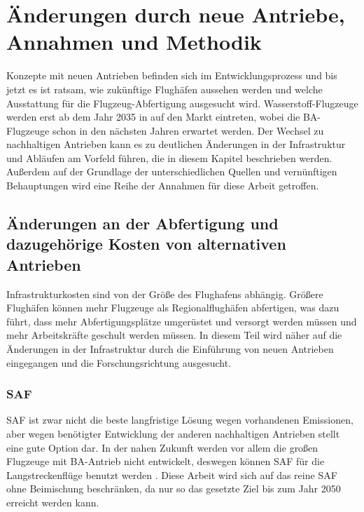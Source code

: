 \chapter{Änderungen durch neue Antriebe, Annahmen und Methodik}
\label{ch:Änderungen durch neue Antriebe, Annahmen und Methodik}

Konzepte mit neuen Antrieben befinden sich im Entwicklungsprozess und bis jetzt es ist ratsam, wie zukünftige Flughäfen aussehen werden
und welche Ausstattung für die Flugzeug-Abfertigung ausgesucht wird. Wasserstoff-Flugzeuge werden erst ab dem Jahr 2035 in 
auf den Markt eintreten, wobei die BA-Flugzeuge schon in den nächsten Jahren erwartet werden.
Der Wechsel zu nachhaltigen Antrieben kann es zu deutlichen Änderungen in der Infrastruktur und Abläufen am Vorfeld führen, die
in diesem Kapitel beschrieben werden.
Außerdem auf der Grundlage der unterschiedlichen Quellen und vernünftigen Behauptungen wird eine Reihe der Annahmen für diese Arbeit getroffen.
%

\section{Änderungen an der Abfertigung und dazugehörige Kosten von alternativen Antrieben}
\label{s:Änderungen an der Abfertigung und dazugehörige Kosten von alternativen Antrieben}

Infrastrukturkosten sind von der Größe des Flughafens abhängig. Größere Flughäfen können mehr Flugzeuge als Regionalflughäfen 
abfertigen, was dazu führt, dass mehr Abfertigungsplätze umgerüstet und versorgt werden müssen und mehr Arbeitskräfte geschult werden müssen. 
In diesem Teil wird näher auf die Änderungen in der Infrastruktur durch die Einführung von neuen Antrieben eingegangen und 
die Forschungsrichtung ausgesucht.

\subsection{SAF}
SAF ist zwar nicht die beste langfristige Lösung wegen vorhandenen Emissionen, aber wegen benötigter Entwicklung der anderen nachhaltigen
Antrieben stellt eine gute Option dar. In der nahen Zukunft werden vor allem die großen Flugzeuge mit BA-Antrieb nicht entwickelt, 
deswegen können SAF für die Langstreckenflüge benutzt werden \cite{dalmia2022powering}.
Diese Arbeit wird sich auf das reine SAF ohne Beimischung beschränken, da nur so das gesetzte Ziel bis zum Jahr 2050 erreicht werden kann.

